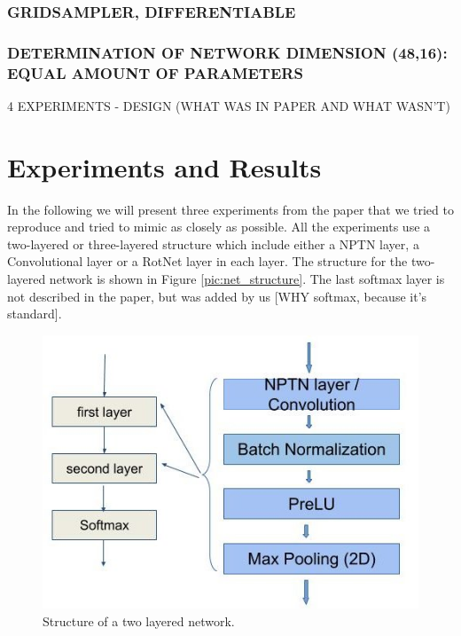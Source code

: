 \documentclass{llncs}
\begin{document}
\subsubsection{GRIDSAMPLER, DIFFERENTIABLE}
\subsubsection{DETERMINATION OF NETWORK DIMENSION (48,16): EQUAL AMOUNT OF PARAMETERS}

4 EXPERIMENTS
- DESIGN (WHAT WAS IN PAPER AND WHAT WASN'T)

\section{Experiments and Results}	
In the following we will present three experiments from the paper that we tried to reproduce and tried to mimic as closely as possible. 
All the experiments use a two-layered or three-layered structure which include either a NPTN layer, a Convolutional layer or a RotNet layer in each layer. The structure for the two-layered network is shown in Figure \ref{pic:net_structure}. The last softmax layer is not described in the paper, but was added by us [WHY softmax, because it's standard]. 

\begin{figure}
	\begin{center}
	\includegraphics[scale=0.35]{result_images/network_structure.jpg}
	\caption{Structure of a two layered network.}
	\label{pic:network_structure}
	\end{center}
\end{figure}
\end{document}
